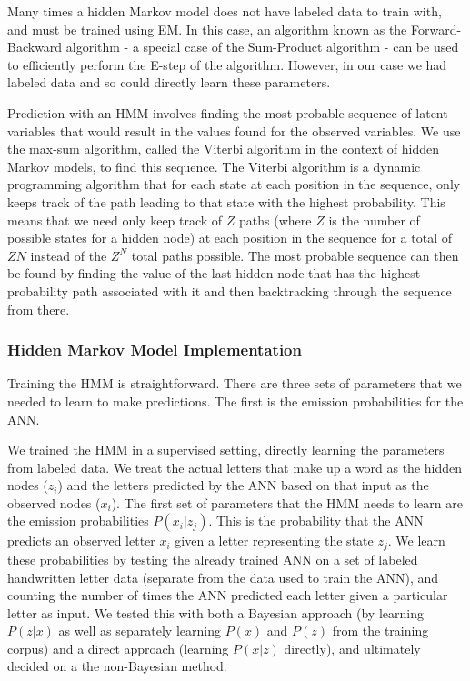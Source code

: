 \documentclass[11pt,a4paper,twocolumn]{article}
\begin{document}
Many times a hidden Markov model does not have labeled data to train with, and must be trained using EM\@. In
this case, an algorithm known as the Forward-Backward algorithm - a special case of the Sum-Product algorithm -
can be used to efficiently perform the E-step of the algorithm. However, in our case we had labeled data
and so could directly learn these parameters.

Prediction with an HMM involves finding the most probable sequence of latent variables
that would result in the values found for the observed variables. We use the max-sum
algorithm, called the Viterbi algorithm in the context of hidden Markov models, to
find this sequence. The Viterbi algorithm is a dynamic programming algorithm that
for each state at each position in the sequence, only keeps track of the path leading
to that state with the highest probability. This means that we need only keep track of
$Z$ paths (where $Z$ is the number of possible states for a hidden node) at each position
in the sequence for a total of $Z N$ instead of the $Z^N$ total paths possible. The most
probable sequence can then be found by finding the value of the last hidden node that has
the highest probability path associated with it and then backtracking through the sequence
from there.

\subsubsection*{Hidden Markov Model Implementation}

Training the HMM is straightforward. There are three sets of parameters
that we needed to learn to make predictions. The first is the emission
probabilities for the ANN\@. 


We trained the HMM in a supervised setting, directly learning the parameters
from labeled data. We treat the actual letters that make up a word as the
hidden nodes ($z_i$) and the letters predicted by the ANN based on that
input as the observed nodes ($x_i$). The first set of parameters that the HMM
needs to learn are the emission probabilities $P(x_i | z_j)$. This is the probability
that the ANN predicts an observed letter $x_i$ given a letter representing
the state $z_j$. We learn these probabilities by testing the already
trained ANN on a set of labeled handwritten letter data (separate from the
data used to train the ANN), and counting the number of times the ANN predicted
each letter given a particular letter as input. We tested this with both a Bayesian
approach (by learning $P(z|x)$ as well as separately learning $P(x)$ and $P(z)$
from the training corpus) and a direct approach (learning $P(x|z)$ directly), and ultimately
decided on a the non-Bayesian method.
\end{document}
